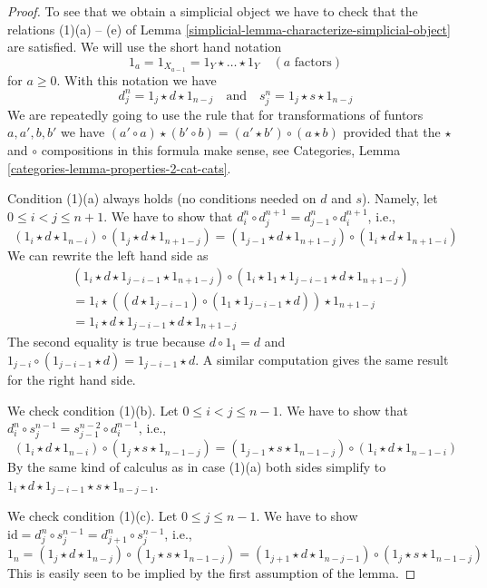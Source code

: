 \begin{proof}

To see that we obtain a simplicial object we have to check that the
relations (1)(a) -- (e) of Lemma \ref{simplicial-lemma-characterize-simplicial-object}
are satisfied. We will use the short hand notation
$$
1_a = 1_{X_{a - 1}} = 1_Y \star \ldots \star 1_Y \quad (a\text{ factors})
$$
for $a \geq 0$. With this notation we have
$$
d^n_j = 1_j \star d \star 1_{n - j}
\quad\text{and}\quad
s^n_j = 1_j \star s \star 1_{n - j}
$$
We are repeatedly going to use the rule that for transformations
of funtors $a, a', b, b'$ we have
$(a' \circ a) \star (b' \circ b) = (a' \star b') \circ (a \star b)$
provided that the $\star$ and $\circ$ compositions in this formula
make sense, see
Categories, Lemma \ref{categories-lemma-properties-2-cat-cats}.

\medskip\noindent
Condition (1)(a) always holds (no conditions needed on $d$ and $s$).
Namely, let $0 \leq i < j \leq n + 1$. We have to show that
$d^n_i \circ d^{n + 1}_j = d^n_{j - 1} \circ d^{n + 1}_i$, i.e.,
$$
(1_i \star d \star 1_{n - i}) \circ
(1_j \star d \star 1_{n + 1 - j}) =
(1_{j - 1} \star d \star 1_{n + 1 - j}) \circ
(1_i \star d \star 1_{n + 1 - i})
$$
We can rewrite the left hand side as
\begin{align*}
& (1_i \star d \star 1_{j - i - 1} \star 1_{n + 1 - j}) \circ
(1_i \star 1_1 \star 1_{j - i - 1} \star d \star 1_{n + 1 - j}) \\
& =
1_i \star
\left((d \star 1_{j - i - 1}) \circ
(1_1 \star 1_{j - i - 1} \star d)\right) \star 1_{n + 1 - j} \\
& =
1_i \star d \star 1_{j - i - 1} \star d \star 1_{n + 1 - j}
\end{align*}
The second equality is true because $d \circ 1_1 = d$ and
$1_{j - i} \circ (1_{j - i - 1} \star d) = 1_{j - i - 1} \star d$.
A similar computation gives the same result for the right hand side.

\medskip\noindent
We check condition (1)(b). Let $0 \leq i < j \leq n - 1$. We have to show
that $d^n_i \circ s^{n - 1}_j = s^{n - 2}_{j - 1} \circ d^{n - 1}_i$, i.e.,
$$
(1_i \star d \star 1_{n - i}) \circ
(1_j \star s \star 1_{n - 1 - j}) =
(1_{j - 1} \star s \star 1_{n - 1 - j}) \circ
(1_i \star d \star 1_{n - 1 - i})
$$
By the same kind of calculus as in case (1)(a) both sides simplify
to $1_i \star d \star 1_{j - i - 1} \star s \star 1_{n - j - 1}$.

\medskip\noindent
We check condition (1)(c). Let $0 \leq j \leq n - 1$. We have to show
$\text{id} = d^n_j \circ s^{n - 1}_j = d^n_{j + 1} \circ s^{n - 1}_j$, i.e.,
$$
1_n =
(1_j \star d \star 1_{n - j}) \circ
(1_j \star s \star 1_{n - 1 - j}) =
(1_{j + 1} \star d \star 1_{n - j - 1}) \circ
(1_j \star s \star 1_{n - 1 - j})
$$
This is easily seen to be implied by the first assumption of the lemma.


\end{proof}

